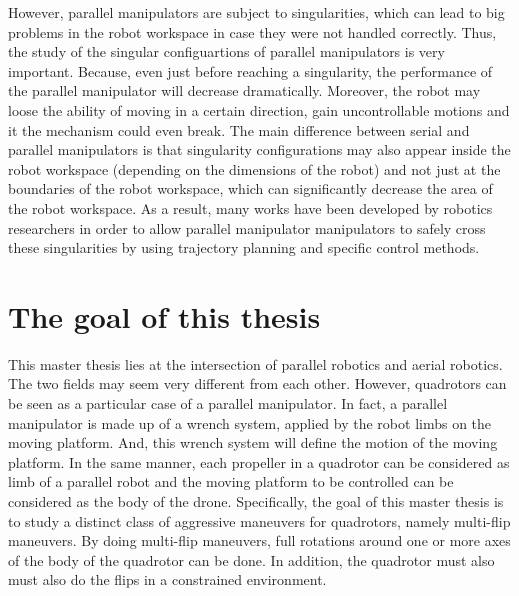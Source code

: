 \documentclass{thesisreport}
\begin{document}


\pagebreak

However, parallel manipulators are subject to singularities, which can lead to big problems in the robot workspace in case they were not handled correctly. Thus, the study of the singular configuartions of parallel manipulators is very important. Because, even just before reaching a singularity, the performance of the parallel manipulator will decrease dramatically. Moreover, the robot may loose the ability of moving in a certain direction, gain uncontrollable motions and it the mechanism could even break. The main difference between serial and parallel manipulators is that singularity configurations may also appear inside the robot workspace (depending on the dimensions of the robot) and not just at the boundaries of the robot workspace, which can significantly decrease the area of the robot workspace.
As a result, many works have been developed by robotics researchers in order to allow parallel manipulator manipulators to safely cross these singularities by using trajectory planning and specific control methods.

\section*{The goal of this thesis}

This master thesis lies at the intersection of parallel robotics and aerial robotics. The two fields may seem very different from each other. However, quadrotors can be seen as a particular case of a parallel manipulator. 
In fact, a parallel manipulator is made up of a wrench system, applied by the robot limbs on the moving platform. And, this wrench system will define the motion of the moving platform. In the same manner, each propeller in a quadrotor can be considered as limb of a parallel robot and the moving platform to be controlled can be considered as the body of the drone. 
Specifically, the goal of this master thesis is to study a distinct class of aggressive maneuvers for quadrotors, namely multi-flip maneuvers. By doing multi-flip maneuvers, full rotations around one or more axes of the body of the quadrotor can be done. In addition, the quadrotor must also must also do the flips in a constrained environment.
\end{document}
